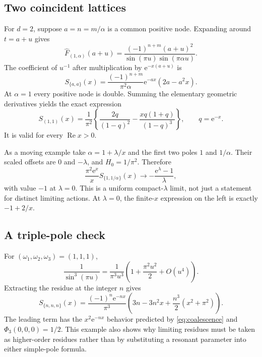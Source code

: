 \documentclass[11pt,a4paper]{article}
\numberwithin{equation}{section}
\theoremstyle{definition}
\theoremstyle{remark}
\newcommand{\e}{\mathrm e}
\newcommand{\re}{\operatorname{Re}}
\begin{document}
\subsection{Two coincident lattices}
For $d=2$, suppose $a=n=m/\alpha$ is a common positive node. Expanding
around $t=a+u$ gives
\[
 \widehat F_{(1,\alpha)}(a+u)
 =\frac{(-1)^{n+m}(a+u)^2}
        {\sin(\pi u)\sin(\pi\alpha u)}.
\]
The coefficient of $u^{-1}$ after multiplication by $\e^{-x(a+u)}$ is
\begin{equation}
 S_{\{a,a\}}(x)=
 \frac{(-1)^{n+m}}{\pi^2\alpha}
       \e^{-ax}(2a-a^2x).
 \label{eq:double-residue}
\end{equation}
At $\alpha=1$ every positive node is double. Summing the elementary
geometric derivatives yields the exact expression
\begin{equation}
 S_{(1,1)}(x)=\frac1{\pi^2}
 \left\{\frac{2q}{(1-q)^2}
       -\frac{xq(1+q)}{(1-q)^3}\right\},\qquad q=\e^{-x}.
 \label{eq:alpha1}
\end{equation}
It is valid for every $\re x>0$.

As a moving example take $\alpha=1+\lambda/x$ and the first two poles
$1$ and $1/\alpha$. Their scaled offsets are $0$ and $-\lambda$, and
$H_0=1/\pi^2$. Therefore
\begin{equation}
 \frac{\pi^2\e^x}{x}S_{\{1,1/\alpha\}}(x)
 \longrightarrow-\frac{\e^\lambda-1}{\lambda},
 \label{eq:two-profile}
\end{equation}
with value $-1$ at $\lambda=0$. This is a uniform compact-$\lambda$
limit, not just a statement for distinct limiting actions.
At $\lambda=0$, the finite-$x$ expression on the left is exactly
$-1+2/x$.

\subsection{A triple-pole check}
For $(\omega_1,\omega_2,\omega_3)=(1,1,1)$,
\[
 \frac1{\sin^3(\pi u)}
 =\frac1{\pi^3u^3}\left(1+\frac{\pi^2u^2}{2}+O(u^4)\right).
\]
Extracting the residue at the integer $n$ gives
\begin{equation}
 S_{\{n,n,n\}}(x)
 =\frac{(-1)^n\e^{-nx}}{\pi^3}
 \left(3n-3n^2x+\frac{n^3}{2}(x^2+\pi^2)\right).
 \label{eq:triple-residue}
\end{equation}
The leading term has the $x^2\e^{-nx}$ behavior predicted by
\eqref{eq:coalescence} and
$\Phi_3(0,0,0)=1/2$. This example also shows why limiting residues must
be taken as higher-order residues rather than by substituting a resonant
parameter into either simple-pole formula.
\end{document}
